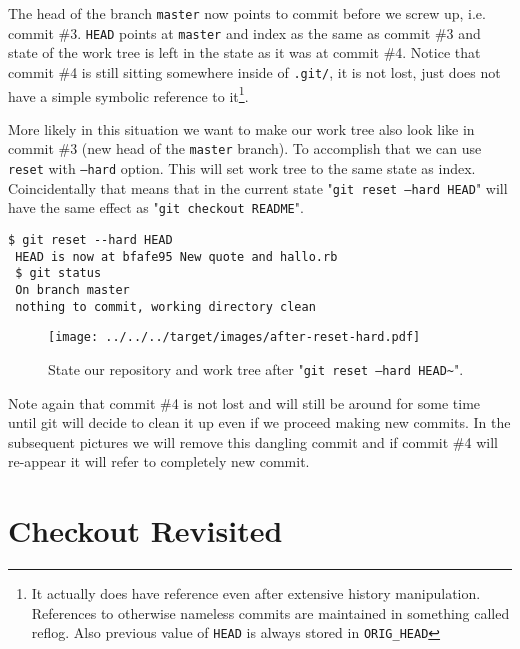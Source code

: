\documentclass{article}
\theoremstyle{definition}
\begin{document}
        The head of the branch \texttt{master} now points to commit before we screw up, i.e.
        commit \#3. \texttt{HEAD} points at \texttt{master} and index as the same as commit \#3 and state of the work
        tree is left in the state as it was at commit \#4. Notice that commit \#4 is still sitting somewhere inside of
        \texttt{.git/}, it is not lost, just does not have a simple symbolic reference to it\footnote{It actually does
        have reference even after extensive history manipulation. References to otherwise nameless commits are
        maintained in something called reflog. Also previous value of \texttt{HEAD} is always stored
        in \texttt{ORIG\_HEAD}}.

        More likely in this situation we want to make our work tree also look like in commit \#3 (new head of
        the \texttt{master} branch). To accomplish that we can use \texttt{reset} with \texttt{--hard} option. This
        will set work tree to the same state as index. Coincidentally that means that in the current
        state "\texttt{git reset --hard HEAD}" will have the same effect as "\texttt{git checkout README}".

        \begin{Verbatim}[frame=single]
 $ git reset --hard HEAD
 HEAD is now at bfafe95 New quote and hallo.rb
 $ git status
 On branch master
 nothing to commit, working directory clean
        \end{Verbatim}

        \begin{figure}[h]
        \centering\texttt{[image: ../../../target/images/after-reset-hard.pdf]}
        \caption{State our repository and work tree after "\texttt{git reset --hard HEAD\textasciitilde}".\label{fig:after-reset-hard}}
        \end{figure}

        \noindent Note again that commit \#4 is not lost and will still be around for some time until git will decide
        to clean it up even if we proceed making new commits. In the subsequent pictures we will remove this dangling
        commit and if commit \#4 will re-appear it will refer to completely new commit.

        \section{Checkout Revisited}
\end{document}
